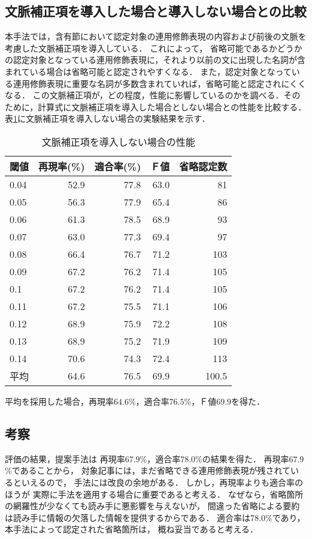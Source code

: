 \subsection{文脈補正項を導入した場合と導入しない場合との比較}
本手法では，含有節において認定対象の連用修飾表現の内容および前後の文脈を考慮した文脈補正項を導入している．
これによって，
省略可能であるかどうかの認定対象となっている連用修飾表現に，それより以前の文に出現した名詞が含まれている場合は省略可能と認定されやすくなる．
また，認定対象となっている連用修飾表現に重要な名詞が多数含まれていれば，省略可能と認定されにくくなる．
この文脈補正項が，どの程度，性能に影響しているのかを調べる．そのために，計算式に文脈補正項を導入した場合としない場合との性能を比較する．
表\ref{Experiment_Resul4}に文脈補正項を導入しない場合の実験結果を示す．
\begin{table}[bt]
\begin{center}
\caption{文脈補正項を導入しない場合の性能} \label{Experiment_Resul4}
\begin{tabular}{l|r|r|r|r}
\hline
閾値 & 再現率(\%) & 適合率(\%) & Ｆ値 & 省略認定数\\ \hline \hline
0.04 & 52.9 & 77.8 & 63.0 & 81 \\ 
0.05 & 56.3 & 77.9 & 65.4 & 86 \\ 
0.06 & 61.3 & 78.5 & 68.9 & 93 \\ 
0.07 & 63.0 & 77.3 & 69.4 & 97 \\ 
0.08 & 66.4 & 76.7 & 71.2 & 103 \\ 
0.09 & 67.2 & 76.2 & 71.4 & 105 \\ 
0.1 & 67.2 & 76.2 & 71.4 & 105 \\ 
0.11 & 67.2 & 75.5 & 71.1 & 106 \\ 
0.12 & 68.9 & 75.9 & 72.2 & 108 \\ 
0.13 & 68.9 & 75.2 & 71.9 & 109 \\ 
0.14 & 70.6 & 74.3 & 72.4 & 113 \\ \hline 
平均 & 64.6 & 76.5 & 69.9 & 100.5 \\ 
\hline
\end{tabular}
\end{center}
\end{table}
平均を採用した場合，再現率$64.6$\%，適合率$76.5$\%，Ｆ値$69.9$を得た．
\subsection{考察}
評価の結果，提案手法は
再現率67.9\%，適合率78.0\%の結果を得た．
再現率$67.9$\%であることから，
対象記事には，まだ省略できる連用修飾表現が残されているといえるので，
手法には改良の余地がある．
しかし，再現率よりも適合率のほうが
実際に手法を適用する場合に重要であると考える．
なぜなら，省略箇所の網羅性が少なくても読み手に悪影響を与えないが，
間違った省略による要約は読み手に情報の欠落した情報を提供するからである．
適合率は78.0\%であり，本手法によって認定された省略箇所は，
概ね妥当であると考える．

